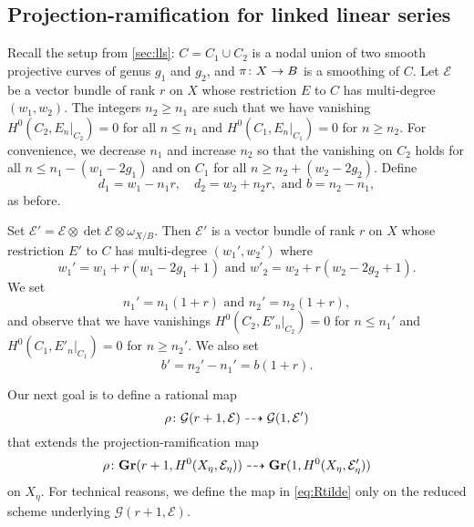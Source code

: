 \subsection{Projection-ramification for linked linear series}
\label{sec:prlls}
Recall the setup from \autoref{sec:lls}: $C = C_1 \cup C_2$ is a nodal union of two smooth projective curves of genus $g_1$ and $g_2$, and $\pi {\colon} X \to B$ is a smoothing of $C$.
Let $\mathcal E$ be a vector bundle of rank $r$ on $X$ whose restriction $E$ to $C$ has multi-degree $(w_1, w_2)$.
The integers $n_2 \geq n_1$ are such that we have vanishing $H^0(C_2, E_n|_{C_2}) = 0$ for all $n \leq n_1$ and $H^0(C_1, E_n|_{C_1}) = 0$ for $n \geq n_2$.
For convenience, we decrease $n_1$ and increase $n_2$ so that the vanishing on $C_2$ holds for all $n \leq n_1 - (w_1-2g_1)$ and on $C_1$ for all $n \geq n_2 + (w_2-2g_2)$.
Define
\[ d_1 = w_1 - n_1r, \quad d_2 = w_2 + n_2r,\text{ and } b = n_2 - n_1,\]
as before.

Set $\mathcal E' = \mathcal E \otimes \det \mathcal E \otimes \omega_{X/B}$.
Then $\mathcal E'$ is a vector bundle of rank $r$ on $X$ whose restriction $E'$ to $C$ has multi-degree $(w_1', w_2')$ where
\[ w_1' = w_1 + r(w_1-2g_1+1) \text{ and } w'_2 = w_2 + r(w_2-2g_2+1).\]
We set
\[ n_1' = n_1(1+r) \text{ and } n_2' = n_2(1+r),\]
and observe that we have vanishings $H^0(C_2, E'_{n}|_{C_2}) = 0$ for $n \leq n_1'$ and $H^0(C_1, E'_{n}|_{C_1}) = 0$ for $n \geq n_2'$.
We also set
\[ b' = n_2' - n_1' = b(1+r).\]

Our next goal is to define a rational map
\begin{equation}\label{eq:Rtilde}
  \rho {\colon} {\mathcal G}(r+1, \mathcal E) \dashrightarrow {\mathcal G}(1, \mathcal E')
\end{equation}
that extends the projection-ramification map
\[
  \rho {\colon} {\bf Gr}(r+1, H^0(X_\eta, \mathcal E_\eta)) \dashrightarrow {\bf Gr}(1, H^0(X_\eta, \mathcal E'_\eta))
\]
on $X_\eta$.
For technical reasons, we define the map in \eqref{eq:Rtilde} only on the reduced scheme underlying ${\mathcal G}(r+1, \mathcal E)$.

